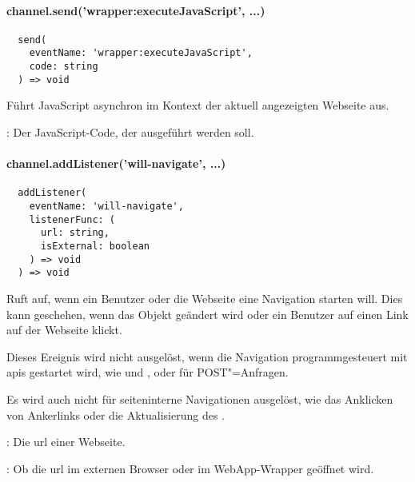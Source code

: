 \paragraph{channel.send('wrapper:executeJavaScript', ...)}

\begin{verbatim}
  send(
    eventName: 'wrapper:executeJavaScript',
    code: string
  ) => void
\end{verbatim}

Führt JavaScript asynchron im Kontext der aktuell angezeigten Webseite aus.

\begin{arguments}
  \item {}: Der JavaScript-Code, der ausgeführt werden soll.
\end{arguments}


\paragraph{channel.addListener('will-navigate', ...)}

\begin{verbatim}
  addListener(
    eventName: 'will-navigate',
    listenerFunc: (
      url: string,
      isExternal: boolean
    ) => void
  ) => void
\end{verbatim}

Ruft  auf, wenn ein Benutzer oder die Webseite eine Navigation starten will.
Dies kann geschehen, wenn das Objekt  geändert wird oder ein Benutzer auf einen Link auf der Webseite klickt.

Dieses Ereignis wird nicht ausgelöst, wenn die Navigation programmgesteuert mit \acsp{api} gestartet wird, wie  und , oder für POST"=Anfragen.

Es wird auch nicht für seiteninterne Navigationen ausgelöst, wie das Anklicken von Ankerlinks oder die Aktualisierung des .

\begin{arguments}
  \item {}: Die \ac{url} einer Webseite.
  \item {}: Ob die \ac{url} im externen Browser oder im WebApp-Wrapper geöffnet wird.
\end{arguments}

